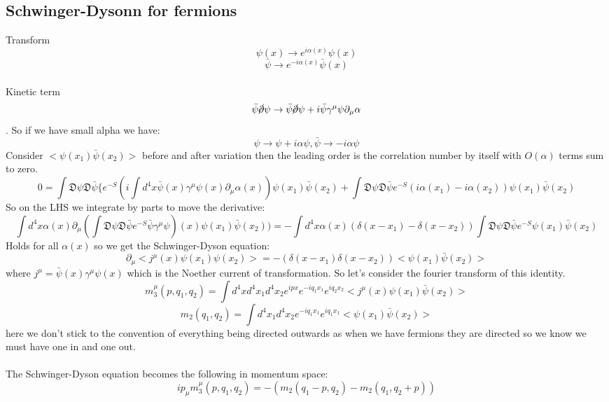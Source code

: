 \documentclass{article}
\begin{document}
         \subsection{Schwinger-Dysonn for fermions}
         Transform $$\psi(x) \rightarrow e^{i \alpha(x)} \psi(x)$$ $$\bar \psi \rightarrow e^{- i \alpha(x)} \bar \psi(x)$$\\
         Kinetic term $$\bar \psi \cancel \partial \psi \rightarrow \bar \psi \cancel \partial \psi + i \bar \psi \gamma^{\mu} \psi \partial_{\mu} \alpha$$. So if we have small alpha we have:
         $$
          \psi \rightarrow \psi + i \alpha \psi, \bar \psi \rightarrow - i \alpha \psi
         $$
         Consider $< \psi(x_1) \bar \psi(x_2)>$ before and after variation then the leading order is the correlation number by itself with $O(\alpha)$ terms sum to zero. 
         $$
         0 = \int \mathfrak{D} \psi \mathfrak{D} \bar \psi \{ e^{-S} ( i \int d^4 x \bar \psi(x) \gamma^{\mu} \psi(x) \partial_{\mu} \alpha(x)) \psi( x_1) \bar \psi(x_2) + \int \mathfrak{D}\psi \mathfrak{D} \bar \psi e^{-S} ( i \alpha (x_1) - i \alpha(x_2)) \psi(x_1) \bar \psi(x_2)
         $$
         So on the LHS we integrate by parts to move the derivative:
        $$
         \int d^4 x \alpha(x) \partial_{\mu} ( \int \mathfrak{D} \psi \mathfrak{D} \bar \psi e^{-S} \bar \psi \gamma^{\mu} \psi )(x) \psi(x_1) \bar \psi(x_2)) = - \int d^4 x \alpha(x) ( \delta( x-x_1) - \delta(x-x_2)) \int \mathfrak{D} \psi \mathfrak{D} \bar \psi e^{-S} \psi( x_1) \bar \psi( x_2)
        $$
        Holds for all $\alpha(x)$ so we get the Schwinger-Dyson equation:
        $$
         \partial_{\mu} < j^{\mu} (x) \psi(x_1) \psi(x_2) > = - ( \delta (x-x_1) \delta (x-x_2)) < \psi(x_1) \bar \psi( x_2)> 
        $$
        where $j^{\mu} = \bar \psi(x) \gamma^{\mu} \psi(x)$ which is the Noether current of transformation. So let's consider the fourier transform of this identity.
        $$
        m_3^{\mu} ( p, q_1, q_2) = \int d^4 x d^4 x_1 d^4 x_2 e^{i px} e^{-i q_1 x_1} e^{i q_2 x_2} < j^{\mu} (x) \psi( x_1) \bar \psi(x_2)>
        $$
        $$
m_2(q_1, q_2) = \int d^4 x_1 d^4 x_2 e^{- i q_1 x_1} e^{i q_1 x_1} < \psi(x_1) \bar \psi(x_2)> 
        $$
        here we don't stick to the convention of everything being directed outwards as when we have fermions they are directed so we know we must have one in and one out. \\\\
        The Schwinger-Dyson equation becomes the following in momentum space:
        $$
        i p_{\mu} m^{\mu}_3 (p, q_1, q_2) = - ( m_2 ( q_1 -p, q_2) - m_2( q_1, q_2 + p))
        $$
\end{document}
